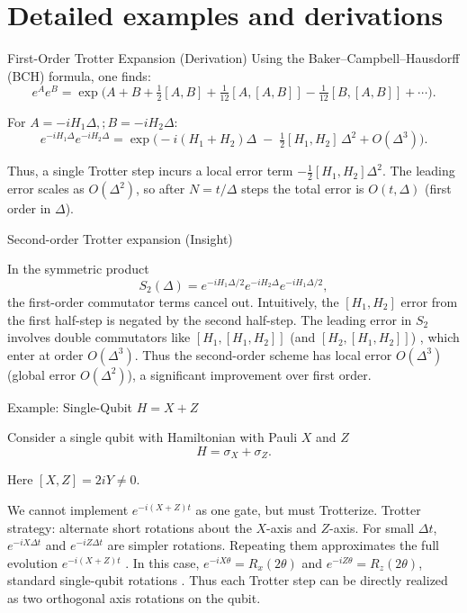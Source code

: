 \documentclass{beamer}
\begin{document}
\section{Detailed examples and derivations}

\begin{frame}{First-Order Trotter Expansion (Derivation)}
Using the Baker–Campbell–Hausdorff (BCH) formula, one finds:
\[
e^{A}e^{B} = \exp\!\Big(A + B + \tfrac{1}{2}[A,B] + \tfrac{1}{12}[A,[A,B]] - \tfrac{1}{12}[B,[A,B]] + \cdots\Big).
\]

For $A=-iH_1 \Delta,;B=-iH_2 \Delta$:
\[
e^{-iH_1 \Delta}e^{-iH_2 \Delta} = \exp\!\Big(-i(H_1+H_2)\Delta \;-\; \tfrac{1}{2}[H_1,H_2]\,\Delta^2 + O(\Delta^3)\Big).
\]

Thus, a single Trotter step incurs a local error term
$-\frac{1}{2}[H_1,H_2]\Delta^2$. The leading error scales as
$O(\Delta^2)$, so after $N=t/\Delta$ steps the total error is
$O(t,\Delta)$ (first order in $\Delta$).

\end{frame}

\begin{frame}{Second-order Trotter expansion (Insight)}

In the symmetric product
\[
S_2(\Delta)=e^{-iH_1\Delta/2}e^{-iH_2\Delta}e^{-iH_1\Delta/2},
\]
the first-order commutator terms cancel out. Intuitively, the $[H_1,H_2]$ error from the first half-step is negated by the second half-step.
The leading error in $S_2$ involves double commutators like $[H_1,[H_1,H_2]]$ (and $[H_2,[H_1,H_2]]$) , which enter at order $O(\Delta^3)$. Thus the second-order scheme has local error $O(\Delta^3)$ (global error $O(\Delta^2)$), a significant improvement over first order. 

\end{frame}


\begin{frame}{Example: Single-Qubit $H = X + Z$}

Consider a single qubit with Hamiltonian with Pauli $X$ and $Z$
\[
H = \sigma_X + \sigma_Z.
\]


Here $[X,Z] = 2iY \neq 0$.

We cannot implement $e^{-i(X+Z)t}$ as one gate, but must Trotterize.
Trotter strategy: alternate short rotations about the $X$-axis and $Z$-axis. For small $\Delta t$, $e^{-iX \Delta t}$ and $e^{-iZ \Delta t}$ are simpler rotations. Repeating them approximates the full evolution $e^{-i(X+Z)t}$ .
In this case, $e^{-iX \theta} = R_x(2\theta)$ and $e^{-iZ \theta} = R_z(2\theta)$, standard single-qubit rotations . Thus each Trotter step can be directly realized as two orthogonal axis rotations on the qubit. 

\end{frame}
\end{document}
